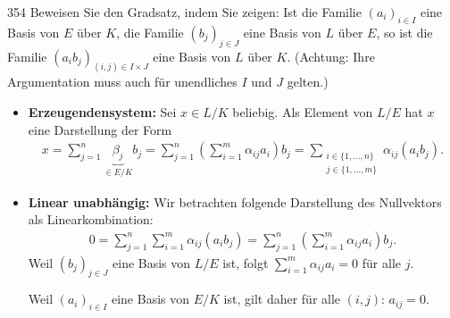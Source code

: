 \begin{algebraUE}{354}
Beweisen Sie den Gradsatz, indem Sie zeigen: Ist die Familie $(a_i)_{i \in I}$
eine Basis von $E$ über $K$, die Familie $(b_j)_{j \in J}$ eine Basis von $L$ über $E$,
so ist die Familie $(a_ib_j)_{(i,j) \in I \times J}$ eine Basis von $L$ über $K$.
(Achtung: Ihre Argumentation muss auch für unendliches $I$ und $J$ gelten.)

\end{algebraUE}

\begin{solution}
  \begin{itemize}
      \item \textbf{Erzeugendensystem:} Sei $x \in L/K$ beliebig. Als Element von $L/E$ hat $x$ eine Darstellung der Form
  \begin{align}
      x = \sum_{j=1}^n \underbrace{\beta_j}_{\in E/K} b_j = \sum_{j=1}^n \left(\sum_{i=1}^m \alpha_{ij} a_i \right) b_j = \sum_{\substack{i \in \{1, ..., n\} \\ {j\in \{1,...,m\}}}} \alpha_{ij} (a_i b_j).
  \end{align}
  \item \textbf{Linear unabhängig:} Wir betrachten folgende Darstellung des Nullvektors als Linearkombination:
  \begin{align}
      0 = \sum_{j=1}^n \sum_{i=1}^m \alpha_{ij} (a_i b_j) = \sum_{j=1}^n \left(\sum_{i=1}^m \alpha_{ij} a_i\right) b_j.
  \end{align}
  Weil $(b_j)_{j \in J}$ eine Basis von $L/E$ ist, folgt $\sum_{i=1}^m \alpha_{ij} a_i = 0$ für alle $j.$

  Weil $(a_i)_{i \in I}$ eine Basis von $E/K$ ist, gilt daher für alle $(i,j)$: $a_{ij} = 0$.
  \end{itemize}
\end{solution}
